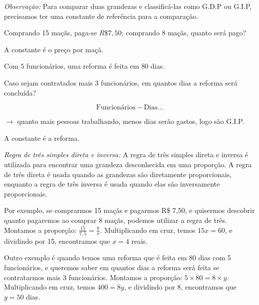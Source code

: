 \documentclass{article}
\begin{document}
\textit{Observação:} Para comparar duas grandezas e classificá-las como G.D.P
 ou G.I.P, precisamos ter uma constante de referência para a comparação.

 \medskip{} Comprando 15 maçãs, paga-se $R\$7,50$; comprando $8$
maçãs, quanto será pago?


A constante é o preço por maçã.

\medskip{} 

Com $5$ funcionários, uma reforma é feita em $80$ dias.

Caso sejam contratados mais $3$ funcionários, em quantos dias a reforma
será concluída?


$$\text{Funcionários} - \text{Dias}...$$

$\rightarrow$ quanto mais pessoas trabalhando, menos dias serão gastos, logo são G.I.P.

A constante é a reforma.

\medskip \noindent  \textit{Regra de três simples direta e inversa:} A regra
 de três simples direta e inversa é utilizada para encontrar uma grandeza
 desconhecida em uma proporção. A regra de três direta é usada quando as
 grandezas são diretamente proporcionais, enquanto a regra de três inversa é
 usada quando elas são inversamente proporcionais.

Por exemplo, se comprarmos 15 maçãs e pagarmos R\$ 7,50, e quisermos descobrir
quanto pagaremos ao comprar 8 maçãs, podemos utilizar a regra de três.
Montamos a proporção: $\frac{15}{7,5} = \frac{8}{x}$. Multiplicando em cruz,
temos $15x = 60$, e dividindo por 15, encontramos que $x = 4$ reais.


Outro exemplo é quando temos uma reforma que é feita em 80 dias com 5
funcionários, e queremos saber em quantos dias a reforma será feita se
contratarmos mais 3 funcionários. Montamos a proporção: $5 \times 80 =
8 \times y$. Multiplicando em cruz, temos $400 = 8y$, e dividindo por 8,
encontramos que $y = 50$ dias.
\end{document}

